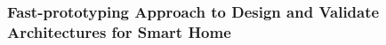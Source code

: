         \subsubsection*{Fast-prototyping Approach to Design and Validate Architectures for Smart Home}  
            


